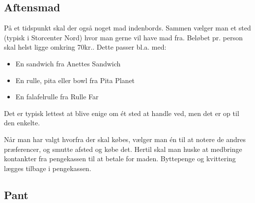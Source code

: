 \subsection{Aftensmad}
\label{sec:intra:aftensmad}
På et tidspunkt skal der også noget mad indenbords. 
Sammen vælger man et sted (typisk i Storcenter Nord) 
hvor man gerne vil have mad fra.
Beløbet pr. person skal helst ligge omkring 70kr..
Dette passer bl.a. med:
\begin{itemize}
    \item En sandwich fra Anettes Sandwich
    \item En rulle, pita eller bowl fra Pita Planet
    \item En falafelrulle fra Rulle Far
\end{itemize}
Det er typisk lettest at blive enige om ét sted at handle ved, 
men det er op til den enkelte.

Når man har valgt hvorfra der skal købes, 
vælger man én til at notere de andres præferencer, 
og smutte afsted og købe det.
Hertil skal man huske at medbringe kontankter fra pengekassen til at betale for maden. 
Byttepenge og kvittering lægges tilbage i pengekassen.

\subsection{Pant}
\label{sec:intra:pant}

